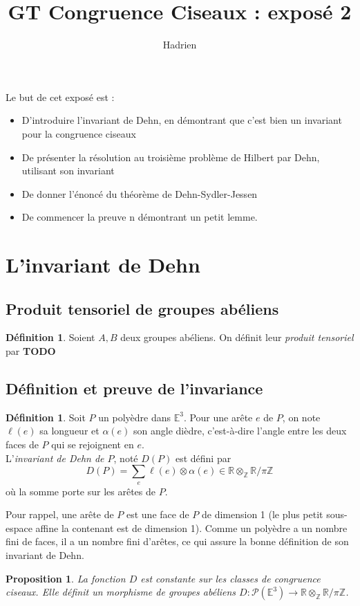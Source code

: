 \documentclass{article}
\title{GT Congruence Ciseaux : exposé 2}
\author{Hadrien}
\date{}
\newcommand{\Z}{\mathbb{Z}}
\newcommand{\R}{\mathbb{R}}
\newcommand{\E}{\mathbb{E}}
\renewcommand{\P}{\mathcal{P}}
\newcommand{\todo}{\textbf{TODO}}
\theoremstyle{plain}
\newtheorem{proposition}[theorem]{Proposition}
\theoremstyle{definition}
\newtheorem{definition}[theorem]{Définition}
\theoremstyle{remark}
\begin{document}
Le but de cet exposé est :
\begin{itemize}
    \item D'introduire l'invariant de Dehn, en démontrant que c'est bien un invariant pour la congruence ciseaux
    \item De présenter la résolution au troisième problème de Hilbert par Dehn, utilisant son invariant
    \item De donner l'énoncé du théorème de Dehn-Sydler-Jessen
    \item De commencer la preuve n démontrant un petit lemme.
\end{itemize}

\section{L'invariant de Dehn}

\subsection{Produit tensoriel de groupes abéliens}

\begin{definition}
    Soient $A,B$ deux groupes abéliens. On définit leur \emph{produit tensoriel} par \todo
\end{definition}

\subsection{Définition et preuve de l'invariance}

\begin{definition}
    Soit $P$ un polyèdre dans $\E^3$. Pour une arête $e$ de $P$, on note $\ell(e)$ sa longueur et $\alpha(e)$ son angle dièdre, c'est-à-dire l'angle entre les deux faces de $P$ qui se rejoignent en $e$. \\
    L'\emph{invariant de Dehn de $P$}, noté $D(P)$ est défini par
    \[D(P) = \sum_e \ell(e) \otimes \alpha(e) \in \R \otimes_\Z \R/\pi\Z\]
    où la somme porte sur les arêtes de $P$.
\end{definition}

Pour rappel, une arête de $P$ est une face de $P$ de dimension 1 (le plus petit sous-espace affine la contenant est de dimension 1). Comme un polyèdre a un nombre fini de faces, il a un nombre fini d'arêtes, ce qui assure la bonne définition de son invariant de Dehn.

\begin{proposition}
    La fonction $D$ est constante sur les classes de congruence ciseaux. Elle définit un morphisme de groupes abéliens $D : \P(\E^3) \to \R \otimes_\Z \R/\pi \Z$.
\end{proposition}
\end{document}
